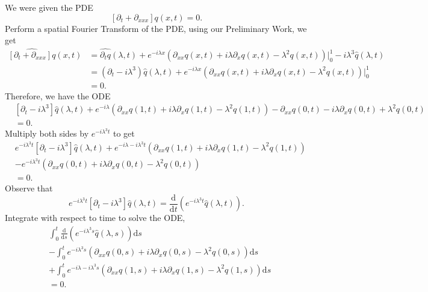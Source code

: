 We were given the PDE
$$[\partial_t+\partial_{xxx}]q(x,t) = 0.$$
Perform a spatial Fourier Transform of the PDE, using our Preliminary Work, we get
\begin{align*}
    \widehat{[\partial_t+\partial_{xxx}]q}(x,t) &= \widehat{\partial_t q}(\lambda,t) + e^{-i\lambda x}\left(\partial_{xx}q(x,t) + i\lambda \partial_{x}q(x,t) - \lambda^2 q(x,t) \right) \bigg\rvert_0^1 - i \lambda^3\widehat{q}(\lambda,t) \\
    &= (\partial_t - i \lambda^3) \widehat{q}(\lambda,t) + e^{-i\lambda x}\left(\partial_{xx}q(x,t) + i\lambda \partial_{x}q(x,t) - \lambda^2 q(x,t) \right) \bigg\rvert_0^1 \\
    &= 0.
\end{align*}
Therefore, we have the ODE
\begin{align*}
&[\partial_t - i \lambda^3] \widehat{q}(\lambda,t) + e^{-i\lambda}\left(\partial_{xx}q(1,t) + i\lambda \partial_{x}q(1,t) - \lambda^2 q(1,t)\right) - \partial_{xx}q(0,t) - i\lambda \partial_{x}q(0,t) + \lambda^2 q(0,t) \\
&= 0.
\end{align*}
Multiply both sides by $e^{-i\lambda^3 t}$ to get
\begin{align*}
&e^{-i\lambda^3 t}[\partial_t - i \lambda^3] \widehat{q}(\lambda,t) + e^{-i\lambda -i\lambda^3 t}\left(\partial_{xx}q(1,t) + i\lambda \partial_{x}q(1,t) - \lambda^2 q(1,t)\right) \\
&- e^{-i\lambda^3 t}\left(\partial_{xx}q(0,t) + i\lambda \partial_{x}q(0,t) - \lambda^2 q(0,t)\right) \\
&= 0.
\end{align*}
Observe that
    $$e^{-i\lambda^3 t}[\partial_t - i \lambda^3] \widehat{q}(\lambda,t) = \frac{\mathrm{d}}{\mathrm{d}t}\left(e^{-i\lambda^3 t}\widehat{q}(\lambda,t)\right).$$
Integrate with respect to time to solve the ODE,
\begin{align*}
&\int_0^t \frac{\mathrm{d}}{\mathrm{d}s} \left(e^{-i\lambda^3 s} \widehat{q}(\lambda,s)\right) \mathrm{d}s \\
&-\int_0^t e^{-i\lambda^3 s}\left(\partial_{xx}q(0,s) + i\lambda \partial_{x}q(0,s) - \lambda^2 q(0,s)\right) \mathrm{d}s \\
&+\int_0^t e^{-i\lambda -i\lambda^3 s}\left(\partial_{xx}q(1,s) + i\lambda \partial_{x}q(1,s) - \lambda^2 q(1,s)\right) \mathrm{d}s \\
&= 0.
\end{align*}

